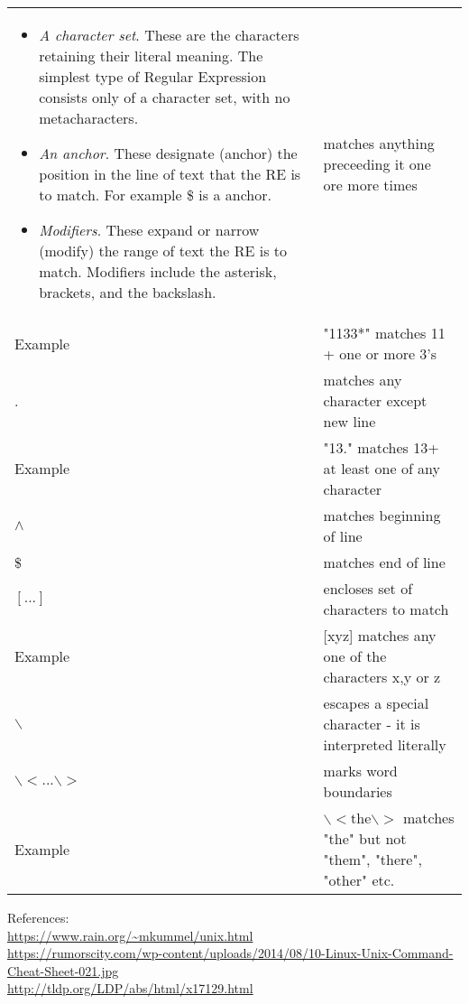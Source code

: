 \documentclass{article}
\begin{document}
\begin{tabular}{>{\ttfamily}ll}
\begin{itemize}
\item \textit{A character set}. These are the characters retaining their literal meaning. The simplest type of Regular Expression consists only of a character set, with no metacharacters.
\item \textit{An anchor}. These designate (anchor) the position in the line of text that the RE is to match. For example \$ is a anchor.
\item \textit{Modifiers}. These expand or narrow (modify) the range of text the RE is to match. Modifiers include the asterisk, brackets, and the backslash.
\end{itemize}

\begin{tabular}{ll}
* & matches anything preceeding it one ore more times \\ 
Example & "1133*" matches 11 + one or more 3's \\ 
. & matches any character except new line \\ 
Example & "13." matches 13+ at least one of any character \\ 
$\wedge$ & matches beginning of line \\ 
\$ & matches end of line \\ 
$[...]$ & encloses set of characters to match \\ 
Example & [xyz] matches any one of the characters x,y or z \\ 
$\backslash$ & escapes a special character - it is interpreted literally \\ 
 $\backslash < ...\backslash >$ & marks word boundaries \\ 			
Example &  $\backslash < \text{the} \backslash >$ matches "the" but not "them", "there", "other" etc. \\ 
\end{tabular} 
\fi

References:\\
\url{https://www.rain.org/~mkummel/unix.html} \\
\url{https://rumorscity.com/wp-content/uploads/2014/08/10-Linux-Unix-Command-Cheat-Sheet-021.jpg}\\
\url{http://tldp.org/LDP/abs/html/x17129.html}\\
\end{document}
